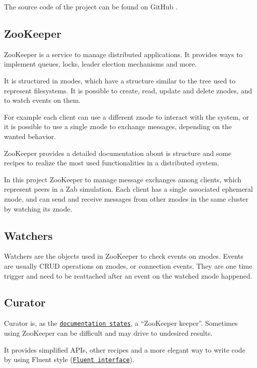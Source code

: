 The source code of the project can be found on GitHub \cite{matteo_marchiori_2021_4679620}.

\subsection{ZooKeeper\label{sec:zookeeper}}
ZooKeeper is a service to manage distributed applications.
It provides ways to implement queues, locks, leader election mechanisms and more.

It is structured in znodes, which have a structure similar to the tree used to represent filesystems.
It is possible to create, read, update and delete znodes, and to watch events on them.

For example each client can use a different znode to interact with the system, or it is possible to use a single znode to exchange messages, depending on the wanted behavior.

ZooKeeper provides a detailed documentation about is structure and some recipes to realize the most used functionalities in a distributed system.

In this project ZooKeeper to manage message exchanges among clients, which represent peers in a Zab simulation.
Each client has a single associated ephemeral znode, and can send and receive messages from other znodes in the same cluster by watching its znode.

\subsection{Watchers\label{sec:watchers}}
Watchers are the objects used in ZooKeeper to check events on znodes.
Events are usually CRUD operations on znodes, or connection events.
They are one time trigger and need to be reattached after an event on the watched znode happened.

\subsection{Curator\label{sec:curator}}
Curator is, as the \href{https://curator.apache.org/getting-started.html}{\texttt{documentation states}}, a ``ZooKeeper keeper''.
Sometimes using ZooKeeper can be difficult and may drive to undesired results.

It provides simplified APIs, other recipes and a more elegant way to write code by using Fluent style (\href{https://en.wikipedia.org/wiki/Fluent_interface}{\texttt{Fluent interface}}).

